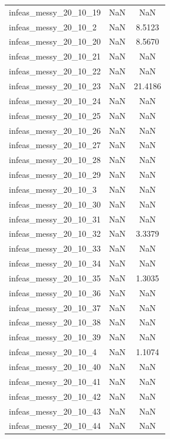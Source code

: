 \begin{longtable}{lcc}
infeas\_messy\_20\_10\_19  &      NaN &     NaN \\
infeas\_messy\_20\_10\_2   &      NaN &  8.5123 \\
infeas\_messy\_20\_10\_20  &      NaN &  8.5670 \\
infeas\_messy\_20\_10\_21  &      NaN &     NaN \\
infeas\_messy\_20\_10\_22  &      NaN &     NaN \\
infeas\_messy\_20\_10\_23  &      NaN & 21.4186 \\
infeas\_messy\_20\_10\_24  &      NaN &     NaN \\
infeas\_messy\_20\_10\_25  &      NaN &     NaN \\
infeas\_messy\_20\_10\_26  &      NaN &     NaN \\
infeas\_messy\_20\_10\_27  &      NaN &     NaN \\
infeas\_messy\_20\_10\_28  &      NaN &     NaN \\
infeas\_messy\_20\_10\_29  &      NaN &     NaN \\
infeas\_messy\_20\_10\_3   &      NaN &     NaN \\
infeas\_messy\_20\_10\_30  &      NaN &     NaN \\
infeas\_messy\_20\_10\_31  &      NaN &     NaN \\
infeas\_messy\_20\_10\_32  &      NaN &  3.3379 \\
infeas\_messy\_20\_10\_33  &      NaN &     NaN \\
infeas\_messy\_20\_10\_34  &      NaN &     NaN \\
infeas\_messy\_20\_10\_35  &      NaN &  1.3035 \\
infeas\_messy\_20\_10\_36  &      NaN &     NaN \\
infeas\_messy\_20\_10\_37  &      NaN &     NaN \\
infeas\_messy\_20\_10\_38  &      NaN &     NaN \\
infeas\_messy\_20\_10\_39  &      NaN &     NaN \\
infeas\_messy\_20\_10\_4   &      NaN &  1.1074 \\
infeas\_messy\_20\_10\_40  &      NaN &     NaN \\
infeas\_messy\_20\_10\_41  &      NaN &     NaN \\
infeas\_messy\_20\_10\_42  &      NaN &     NaN \\
infeas\_messy\_20\_10\_43  &      NaN &     NaN \\
infeas\_messy\_20\_10\_44  &      NaN &     NaN \\

\end{longtable}
